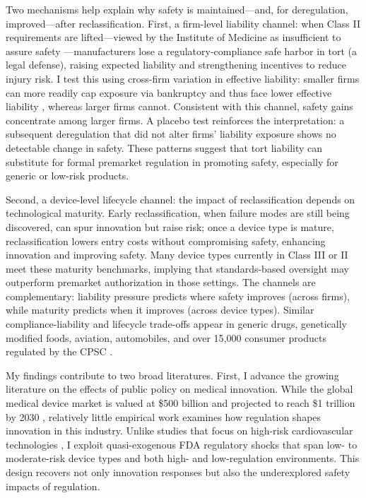 \documentclass[letterpaper,12pt]{article}
\theoremstyle{definition}
\begin{document}
Two mechanisms help explain why safety is maintained---and, for deregulation, improved---after reclassification. First, a firm-level liability channel: when Class II requirements are lifted---viewed by the Institute of Medicine as insufficient to assure safety ---manufacturers lose a regulatory-compliance safe harbor in tort (a legal defense), raising expected liability and strengthening incentives to reduce injury risk. I test this using cross-firm variation in effective liability: smaller firms can more readily cap exposure via bankruptcy and thus face lower effective liability \citep{shavell1986judgment}, whereas larger firms cannot. Consistent with this channel, safety gains concentrate among larger firms. A placebo test reinforces the interpretation: a subsequent deregulation that did not alter firms' liability exposure shows no detectable change in safety. These patterns suggest that tort liability can substitute for formal premarket regulation in promoting safety, especially for generic or low-risk products. 

Second, a device-level lifecycle channel: the impact of reclassification depends on technological maturity. Early reclassification, when failure modes are still being discovered, can spur innovation but raise risk; once a device type is mature, reclassification lowers entry costs without compromising safety, enhancing innovation and improving safety. Many device types currently in Class III or II meet these maturity benchmarks, implying that standards-based oversight may outperform premarket authorization in those settings. The channels are complementary: liability pressure predicts where safety improves (across firms), while maturity predicts when it improves (across device types). Similar compliance-liability and lifecycle trade-offs appear in generic drugs, genetically modified foods, aviation, automobiles, and over 15{,}000 consumer products regulated by the CPSC \citep{schwartz2020s,schauzu2000concept,pisanifederal}.



My findings contribute to two broad literatures. First, I advance the growing literature on the effects of public policy on medical innovation.\footnotemark {} While the global medical device market is valued at \$500 billion and projected to reach \$1 trillion by 2030 \citep{stewart_2022}, relatively little empirical work examines how regulation shapes innovation in this industry. Unlike studies that focus on high-risk cardiovascular technologies \citep{stern2017innovation,Grennan:2020}, I exploit quasi-exogenous FDA regulatory shocks that span low- to moderate-risk device types and both high- and low-regulation environments. This design recovers not only innovation responses but also the underexplored safety impacts of regulation. 
\end{document}
